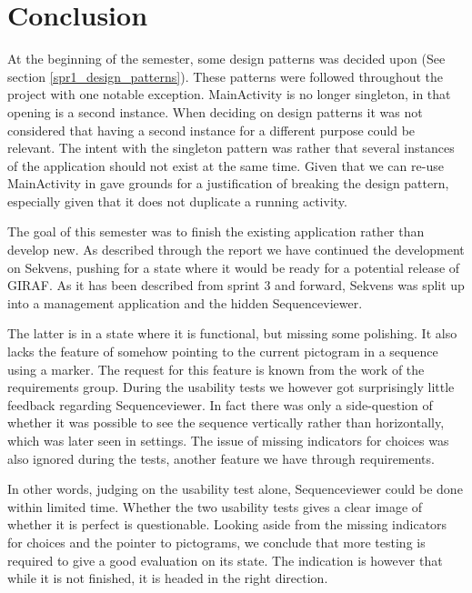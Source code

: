 \section{Conclusion}\label{sec:conclusion}

At the beginning of the semester, some design patterns was decided upon (See section \ref{spr1_design_patterns}). These patterns were followed throughout the project with one notable exception. MainActivity is no longer singleton, in that opening  is a second instance. When deciding on design patterns it was not considered that having a second instance for a different purpose could be relevant. The intent with the singleton pattern was rather that several instances of the application should not exist at the same time. Given that we can re-use MainActivity in  gave grounds for a justification of breaking the design pattern, especially given that it does not duplicate a running activity.

The goal of this semester was to finish the existing application rather than develop new. As described through the report we have continued the development on Sekvens, pushing for a state where it would be ready for a potential release of GIRAF. As it has been described from sprint 3 and forward, Sekvens was split up into a management application and the hidden Sequenceviewer.

The latter is in a state where it is functional, but missing some polishing. It also lacks the feature of somehow pointing to the current pictogram in a sequence using a marker. The request for this feature is known from the work of the requirements group. During the usability tests we however got surprisingly little feedback regarding Sequenceviewer. In fact there was only a side-question of whether it was possible to see the sequence vertically rather than horizontally, which was later seen in settings. The issue of missing indicators for choices was also ignored during the tests, another feature we have through requirements.

In other words, judging on the usability test alone, Sequenceviewer could be done within limited time. Whether the two usability tests gives a clear image of whether it is perfect is questionable. Looking aside from the missing indicators for choices and the pointer to pictograms, we conclude that more testing is required to give a good evaluation on its state. The indication is however that while it is not finished, it is headed in the right direction.

